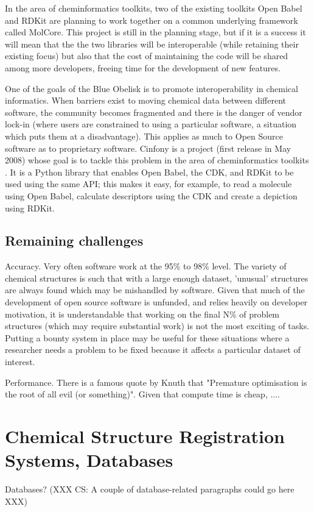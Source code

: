 \documentclass[10pt]{bmc_article}
\newenvironment{bmcformat}{\begin{raggedright}\baselineskip20pt\sloppy\setboolean{publ}{false}}{\end{raggedright}\baselineskip20pt\sloppy}
\begin{document}
\begin{bmcformat}
In the area of cheminformatics toolkits, two of the existing toolkits
Open Babel and RDKit are planning to work together on a common
underlying framework called MolCore.\cite{WebMolCore} This project is still in the
planning stage, but if it is a success it will mean that the the two
libraries will be interoperable (while retaining their existing focus)
but also that the cost of maintaining the code will be shared among
more developers, freeing time for the development of new features.

One of the goals of the Blue Obelisk is to promote interoperability in chemical
informatics. When barriers exist to moving chemical data between
different software, the community becomes fragmented and there is
the danger of vendor lock-in (where users are constrained to using
a particular software, a situation which puts them at a
disadvantage). This applies as much to Open Source software as to
proprietary software. Cinfony is a project (first release in May 2008)
whose goal is to tackle this problem in the area of cheminformatics
toolkits \cite{OBoyleCinfony2008}.
It is a Python library that enables Open Babel, the CDK, and RDKit to
be used using the same API; this makes it easy, for example, to read a
molecule using Open Babel, calculate descriptors using the CDK and
create a depiction using RDKit.

  \subsection*{Remaining challenges}

Accuracy. Very often software work at the 95\% to 98\% level. The
variety of chemical structures is such that with a large enough
dataset, 'unusual' structures are always found which may be mishandled
by software. Given that much of the development of open source
software is unfunded, and relies heavily on developer motivation, it
is understandable that working on the final N\% of problem structures
(which may require substantial work) is not the most exciting of
tasks. Putting a bounty system in place may be useful for these
situations where a researcher needs a problem to be fixed because it
affects a particular dataset of interest.

Performance. There is a famous quote by Knuth that "Premature
optimisation is the root of all evil (or something)". Given that compute
time is cheap, ....

\section*{Chemical Structure Registration Systems, Databases}
Databases? (XXX CS: A couple of database-related paragraphs could go here XXX)


\end{bmcformat}
\end{document}
